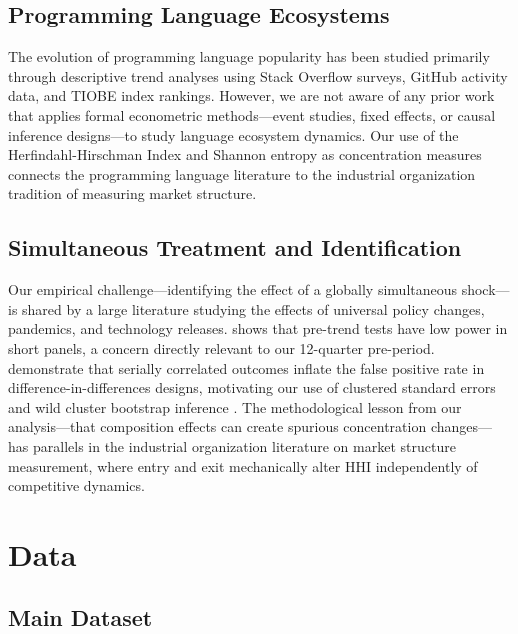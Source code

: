 \documentclass[12pt]{article}
\begin{document}
\subsection{Programming Language Ecosystems}

The evolution of programming language popularity has been studied primarily through descriptive trend analyses using Stack Overflow surveys, GitHub activity data, and TIOBE index rankings. However, we are not aware of any prior work that applies formal econometric methods---event studies, fixed effects, or causal inference designs---to study language ecosystem dynamics. Our use of the Herfindahl-Hirschman Index \citep{herfindahl1950concentration} and Shannon entropy \citep{shannon1948mathematical} as concentration measures connects the programming language literature to the industrial organization tradition of measuring market structure.

\subsection{Simultaneous Treatment and Identification}

Our empirical challenge---identifying the effect of a globally simultaneous shock---is shared by a large literature studying the effects of universal policy changes, pandemics, and technology releases. \citet{roth2022pretest} shows that pre-trend tests have low power in short panels, a concern directly relevant to our 12-quarter pre-period. \citet{bertrand2004much} demonstrate that serially correlated outcomes inflate the false positive rate in difference-in-differences designs, motivating our use of clustered standard errors and wild cluster bootstrap inference \citep{cameron2008bootstrap}. The methodological lesson from our analysis---that composition effects can create spurious concentration changes---has parallels in the industrial organization literature on market structure measurement, where entry and exit mechanically alter HHI independently of competitive dynamics.

\section{Data}

\subsection{Main Dataset}
\end{document}
